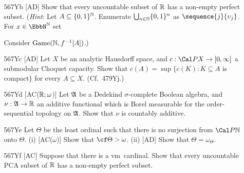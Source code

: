 {\spheader 567Yb [AD] Show that every uncountable subset of $\Bbb R$ has a
non-empty perfect subset.
({\it Hint\/}:  Let $A\subseteq\{0,1\}^{\Bbb N}$.
Enumerate $\bigcup_{n\in\Bbb N}\{0,1\}^n$ as
$\sequence{j}{\upsilon_j}$.   For $x\in\NN$ set


\noindent Consider $\Game(\Bbb N,f^{-1}[A])$.)

\spheader 567Yc [AD]
Let $X$ be an analytic Hausdorff space, and
$c:\Cal PX\to[0,\infty]$ a submodular Choquet capacity.   Show that
$c(A)=\sup\{c(K):K\subseteq A$ is compact$\}$  for every
$A\subseteq X$.  (Cf.\ 479Yj.)

\spheader 567Yd
[AC($\Bbb R;\omega$)] Let $\frak A$ be a Dedekind $\sigma$-complete Boolean
algebra, and $\nu:\frak A\to\Bbb R$ an additive functional which is Borel
measurable for the order-sequential topology on $\frak A$.   Show that
$\nu$ is countably additive.

\spheader 567Ye Let $\Theta$ be the least ordinal such that there
is no surjection from $\Cal P\Bbb N$ onto $\Theta$.
(i) [AC($\omega$)] Show that $\cf\Theta>\omega$.
(ii) [AD] Show that $\Theta=\omega_{\Theta}$.

\spheader 567Yf
[AC] Suppose that there is a \2vm\ cardinal.   Show that
every uncountable PCA subset of $\Bbb R$ has a non-empty perfect subset.
}%

